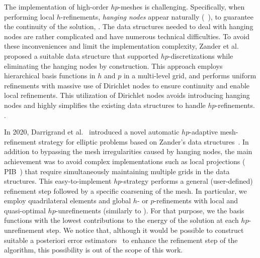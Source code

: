 The implementation of high-order $hp$-meshes is challenging. Specifically, when performing local $h$-refinements, \emph{hanging nodes} appear naturally (~\cite{demkowicz2007computing,solin2003higher}),  to guarantee the continuity of the solution, . The data structures needed to deal with hanging nodes are rather complicated and have numerous technical difficulties. To avoid these inconveniences and limit the implementation complexity, Zander et al.~\cite{zander2015multi} proposed a suitable data structure that supported $hp$-discretizations while eliminating the hanging nodes by construction. This approach employs hierarchical basis functions in $h$ and $p$ in a multi-level grid, and performs uniform refinements with massive use of Dirichlet nodes to ensure continuity and enable local refinements. 
This  utilization of Dirichlet nodes avoids introducing hanging nodes and highly simplifies the existing data structures to handle $hp$-refinements. .

In 2020, Darrigrand et al.~\cite{darrigrand2020painless} introduced a novel automatic $hp$-adaptive mesh-refinement strategy for elliptic problems based on Zander's data structures~\cite{zander2015multi,zander2016multi,zander2017multi}. In addition to bypassing the mesh irregularities caused by hanging nodes, the main achievement was to avoid complex implementations such as local projections ( PIB~\cite{demkowicz2002fully}) that require simultaneously maintaining multiple grids in the data structures. This easy-to-implement $hp$-strategy performs a general (user-defined) refinement step followed by a specific coarsening of the mesh. In particular, we employ quadrilateral elements and  global $h$- or $p$-refinements with local and quasi-optimal $hp$-unrefinements (similarly to \cite{binev2013instance,canuto2017convergence}). For that purpose, we  the basis functions with the lowest contributions to the energy of the solution at each $hp$-unrefinement step. We notice that, although it would be possible to construct suitable a posteriori error estimators~\cite{ainsworth1997posteriori} to enhance the refinement step of the algorithm, this possibility is out of the scope of this work.


